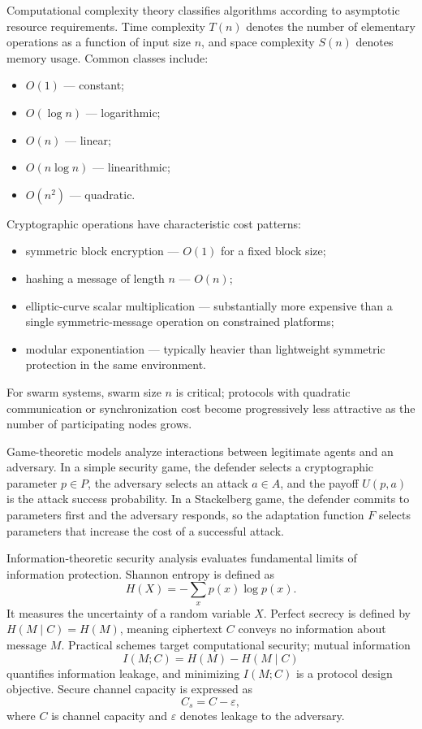 Computational complexity theory classifies algorithms according to asymptotic resource requirements. Time complexity $T(n)$ denotes the number of elementary operations as a function of input size $n$, and space complexity $S(n)$ denotes memory usage. Common classes include:
\begin{itemize}
  \item $O(1)$ --- constant;
  \item $O(\log n)$ --- logarithmic;
  \item $O(n)$ --- linear;
  \item $O(n \log n)$ --- linearithmic;
  \item $O(n^2)$ --- quadratic.
\end{itemize}
Cryptographic operations have characteristic cost patterns:
\begin{itemize}
  \item symmetric block encryption --- $O(1)$ for a fixed block size;
  \item hashing a message of length $n$ --- $O(n)$;
  \item elliptic-curve scalar multiplication --- substantially more expensive than a single symmetric-message operation on constrained platforms;
  \item modular exponentiation --- typically heavier than lightweight symmetric protection in the same environment.
\end{itemize}
For swarm systems, swarm size $n$ is critical; protocols with quadratic communication or synchronization cost become progressively less attractive as the number of participating nodes grows.

Game-theoretic models analyze interactions between legitimate agents and an adversary. In a simple security game, the defender selects a cryptographic parameter $p \in P$, the adversary selects an attack $a \in A$, and the payoff $U(p,a)$ is the attack success probability.
In a Stackelberg game, the defender commits to parameters first and the adversary responds, so the adaptation function $F$ selects parameters that increase the cost of a successful attack.

Information-theoretic security analysis evaluates fundamental limits of information protection. Shannon entropy is defined as
\begin{equation}
H(X) = - \sum_x p(x)\log p(x).
\label{eq:shannon_entropy}
\end{equation}
It measures the uncertainty of a random variable $X$. Perfect secrecy is defined by $H(M \mid C) = H(M)$, meaning ciphertext $C$ conveys no information about message $M$. Practical schemes target computational security; mutual information
\[
I(M;C) = H(M) - H(M \mid C)
\]
quantifies information leakage, and minimizing $I(M;C)$ is a protocol design objective. Secure channel capacity is expressed as
\begin{equation}
C_s = C - \varepsilon,
\label{eq:secure_capacity}
\end{equation}
where $C$ is channel capacity and $\varepsilon$ denotes leakage to the adversary.

